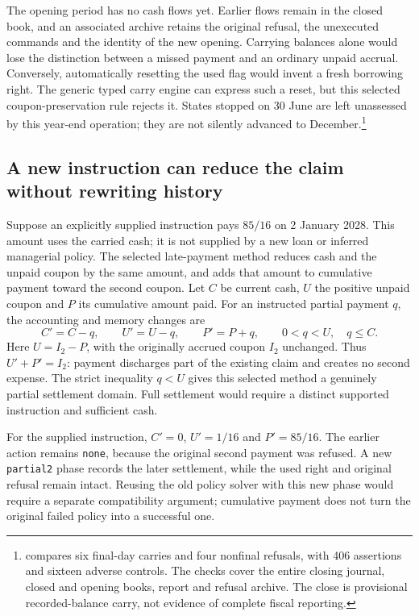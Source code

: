 The opening period has no cash flows yet. Earlier flows remain in the closed book, and an associated archive retains the original refusal, the unexecuted commands and the identity of the new opening. Carrying balances alone would lose the distinction between a missed payment and an ordinary unpaid accrual. Conversely, automatically resetting the used flag would invent a fresh borrowing right. The generic typed carry engine can express such a reset, but this selected coupon-preservation rule rejects it. States stopped on 30 June are left unassessed by this year-end operation; they are not silently advanced to December.\footnote{ compares six final-day carries and four nonfinal refusals, with 406 assertions and sixteen adverse controls. The checks cover the entire closing journal, closed and opening books, report and refusal archive. The close is provisional recorded-balance carry, not evidence of complete fiscal reporting.}

\subsection{A new instruction can reduce the claim without rewriting history}

Suppose an explicitly supplied instruction pays $85/16$ on 2 January 2028. This amount uses the carried cash; it is not supplied by a new loan or inferred managerial policy. The selected late-payment method reduces cash and the unpaid coupon by the same amount, and adds that amount to cumulative payment toward the second coupon. Let $C$ be current cash, $U$ the positive unpaid coupon and $P$ its cumulative amount paid. For an instructed partial payment $q$, the accounting and memory changes are
\begin{equation}
 C'=C-q,\qquad U'=U-q,\qquad P'=P+q,
 \qquad 0<q<U,\quad q\le C.
 \label{eq:late-partial-coupon}
\end{equation}
Here $U=I_2-P$, with the originally accrued coupon $I_2$ unchanged. Thus $U'+P'=I_2$: payment discharges part of the existing claim and creates no second expense. The strict inequality $q<U$ gives this selected method a genuinely partial settlement domain. Full settlement would require a distinct supported instruction and sufficient cash.

For the supplied instruction, $C'=0$, $U'=1/16$ and $P'=85/16$. The earlier action remains \texttt{none}, because the original second payment was refused. A new \texttt{partial2} phase records the later settlement, while the used right and original refusal remain intact. Reusing the old policy solver with this new phase would require a separate compatibility argument; cumulative payment does not turn the original failed policy into a successful one.

